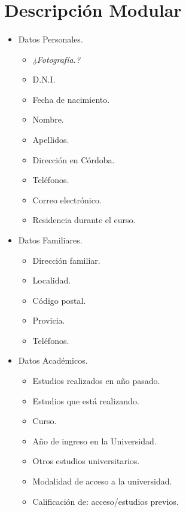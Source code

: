 \section{Descripción Modular}

\paragraph{}

\begin{itemize}
   \item Datos Personales.
   \begin{itemize}
      \item \textit{¿Fotografía.?}
      \item D.N.I.
      \item Fecha de nacimiento.
      \item Nombre.
      \item Apellidos.
      \item Dirección en Córdoba.
      \item Teléfonos.
      \item Correo electrónico.
      \item Residencia durante el curso.
   \end{itemize}
   \item Datos Familiares.
   \begin{itemize}
      \item Dirección familiar.
      \item Localidad.
      \item Código postal.
      \item Provicia.
      \item Teléfonos.
   \end{itemize}
   \item Datos Académicos.
   \begin{itemize}
      \item Estudios realizados en año pasado.
      \item Estudios que está realizando.
      \item Curso.
      \item Año de ingreso en la Universidad.
      \item Otros estudios universitarios.
      \item Modalidad de acceso a la universidad.
      \item Calificación de: acceso/estudios previos.
   \end{itemize}
\end{itemize}


